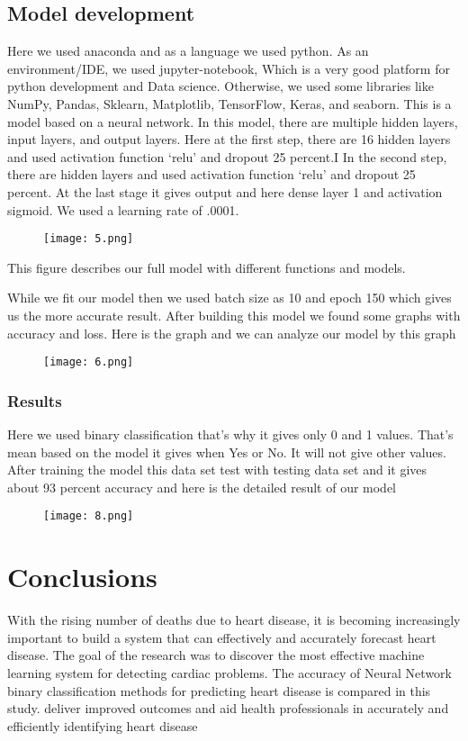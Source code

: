 \documentclass[12pt]{article}
\begin{document}
\subsection{Model development}
Here we used anaconda and as a language we used python. As an environment/IDE, we used jupyter-notebook, Which is a very good platform for python development and Data science. Otherwise, we used some libraries like NumPy, Pandas, Sklearn, Matplotlib, TensorFlow, Keras, and seaborn.
This is a model based on a neural network. In this model, there are multiple hidden layers, input layers, and output layers. Here at the first step, there are 16 hidden layers and used activation function ‘relu’ and dropout 25 percent.I In the second step, there are hidden layers and used activation function ‘relu’ and dropout 25 percent. At the last stage it gives output and here dense layer 1 and activation sigmoid. We used a learning rate of .0001.

\begin{figure}[h]
    \centering
    \texttt{[image: 5.png]}
\end{figure}

This figure describes our full model with different functions and models.


While we fit our model then we used batch size as 10 and epoch 150 which gives us the more accurate result.  After building this model we found some graphs with accuracy and loss. Here is the graph and we can analyze our model by this graph

\begin{figure}[h]
    \centering
    \texttt{[image: 6.png]}
\end{figure}


\subsubsection{Results}
Here we used binary classification that’s why it gives only 0 and 1 values. That’s mean based on the model it gives when Yes or No. It will not give other values. After training the model this data set test with testing data set and it gives about 93 percent  accuracy and here is the detailed result of our model

\begin{figure}[h]
    \centering
    \texttt{[image: 8.png]}
\end{figure}


\section{Conclusions}
With the rising number of deaths due to heart disease, it is becoming increasingly important to build a system that can effectively and accurately forecast heart disease. The goal of the research was to discover the most effective machine learning system for detecting cardiac problems. The accuracy of Neural Network binary classification methods for predicting heart disease is compared in this study.
deliver improved outcomes and aid health professionals in accurately and efficiently identifying heart disease
\end{document}

